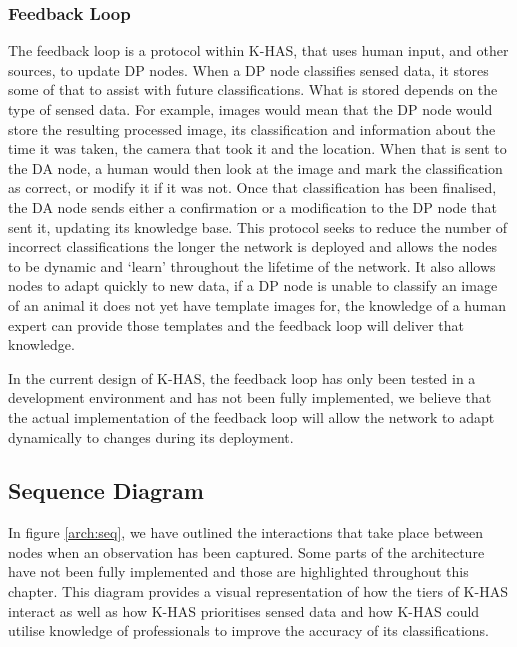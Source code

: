 	\subsubsection{Feedback Loop}\label{fbloop}
	The feedback loop is a protocol within K-HAS, that uses human input, and other sources, to update DP nodes. When a DP node classifies sensed data, it stores some of that to assist with future classifications. What is stored depends on the type of sensed data. For example, images would mean that the DP node would store the resulting processed image, its classification and information about the time it was taken, the camera that took it and the location. When that is sent to the DA node, a human would then look at the image and mark the classification as correct, or modify it if it was not. Once that classification has been finalised, the DA node sends either a confirmation or a modification to the DP node that sent it, updating its knowledge base. This protocol seeks to reduce the number of incorrect classifications the longer the network is deployed and allows the nodes to be dynamic and `learn' throughout the lifetime of the network. It also allows nodes to adapt quickly to new data, if a DP node is unable to classify an image of an animal it does not yet have template images for, the knowledge of a human expert can provide those templates and the feedback loop will deliver that knowledge.
	
	In the current design of K-HAS, the feedback loop has only been tested in a development environment and has not been fully implemented, we believe that the actual implementation of the feedback loop will allow the network to adapt dynamically to changes during its deployment.

	\subsection{Sequence Diagram}
	In figure \ref{arch:seq}, we have outlined the interactions that take place between nodes when an observation has been captured. Some parts of the architecture have not been fully implemented and those are highlighted throughout this chapter. This diagram provides a visual representation of how the tiers of K-HAS interact as well as how K-HAS prioritises sensed data and how K-HAS could utilise knowledge of professionals to improve the accuracy of its classifications.

